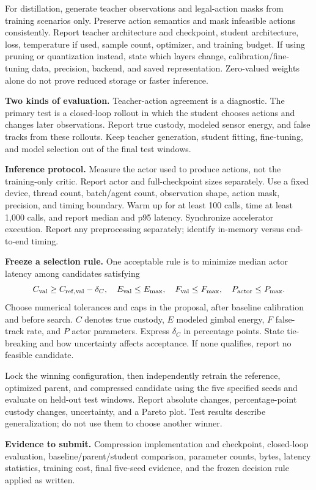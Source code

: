 \documentclass[11pt,letterpaper]{article}
\newcommand{\deliver}[1]{\medskip\textbf{Evidence to submit.} #1}
\begin{document}
For distillation, generate teacher observations and legal-action masks from training scenarios only. Preserve action semantics and mask infeasible actions consistently. Report teacher architecture and checkpoint, student architecture, loss, temperature if used, sample count, optimizer, and training budget. If using pruning or quantization instead, state which layers change, calibration/fine-tuning data, precision, backend, and saved representation. Zero-valued weights alone do not prove reduced storage or faster inference.

\textbf{Two kinds of evaluation.} Teacher-action agreement is a diagnostic. The primary test is a closed-loop rollout in which the student chooses actions and changes later observations. Report true custody, modeled sensor energy, and false tracks from these rollouts. Keep teacher generation, student fitting, fine-tuning, and model selection out of the final test windows.

\textbf{Inference protocol.} Measure the actor used to produce actions, not the training-only critic. Report actor and full-checkpoint sizes separately. Use a fixed device, thread count, batch/agent count, observation shape, action mask, precision, and timing boundary. Warm up for at least 100 calls, time at least 1,000 calls, and report median and p95 latency. Synchronize accelerator execution. Report any preprocessing separately; identify in-memory versus end-to-end timing.

\textbf{Freeze a selection rule.} One acceptable rule is to minimize median actor latency among candidates satisfying
\[
C_{\rm val}\ge C_{\rm ref,val}-\delta_C,\quad
E_{\rm val}\le E_{\max},\quad
F_{\rm val}\le F_{\max},\quad P_{\rm actor}\le P_{\max}.
\]
Choose numerical tolerances and caps in the proposal, after baseline calibration and before search. $C$ denotes true custody, $E$ modeled gimbal energy, $F$ false-track rate, and $P$ actor parameters. Express $\delta_C$ in percentage points. State tie-breaking and how uncertainty affects acceptance. If none qualifies, report no feasible candidate.

Lock the winning configuration, then independently retrain the reference, optimized parent, and compressed candidate using the five specified seeds and evaluate on held-out test windows. Report absolute changes, percentage-point custody changes, uncertainty, and a Pareto plot. Test results describe generalization; do not use them to choose another winner.

\deliver{Compression implementation and checkpoint, closed-loop evaluation, baseline/parent/student comparison, parameter counts, bytes, latency statistics, training cost, final five-seed evidence, and the frozen decision rule applied as written.}
\end{document}
